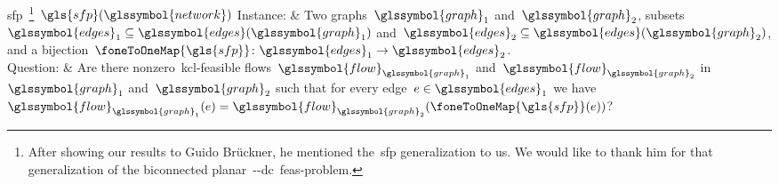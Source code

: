 \begin{problem}[framed]{
% 
\acrlong{sfp}~\footnote{After showing our results to Guido Br\"uckner, he
mentioned the~\gls{sfp} generalization to us. We would like to thank him for
that generalization of the biconnected
planar~\source-\sink-\gls{dc}~\gls{feas}-problem.}~$\gls{sfp}(
\glssymbol{network})$
% 
}%
% 
% 
  Instance: & Two graphs~$\glssymbol{graph}_1$ and~$\glssymbol{graph}_2$,
  subsets $
    \glssymbol{edges}_1
    \subseteq
    \glssymbol{edges}(\glssymbol{graph}_1)
  $ and~$
    \glssymbol{edges}_2
    \subseteq
    \glssymbol{edges}(\glssymbol{graph}_2)
  $, and a bijection~$
    \foneToOneMap{\gls{sfp}}
    \colon 
    \glssymbol{edges}_1 
    \to
    \glssymbol{edges}_2$.
  \\
  Question: & Are there nonzero~\gls{kcl}-feasible flows~$
    \glssymbol{flow}_{\glssymbol{graph}_1}
  $ and~$
    \glssymbol{flow}_{\glssymbol{graph}_2}
  $ in~$\glssymbol{graph}_1$ and~$\glssymbol{graph}_2$  
  such that for every edge~$\edge\in\glssymbol{edges}_1$ we have~$
    \glssymbol{flow}_{\glssymbol{graph}_1}(\edge) 
    =
    \glssymbol{flow}_{\glssymbol{graph}_2}(\foneToOneMap{\gls{sfp}}(\edge))
  $?
\end{problem}%
